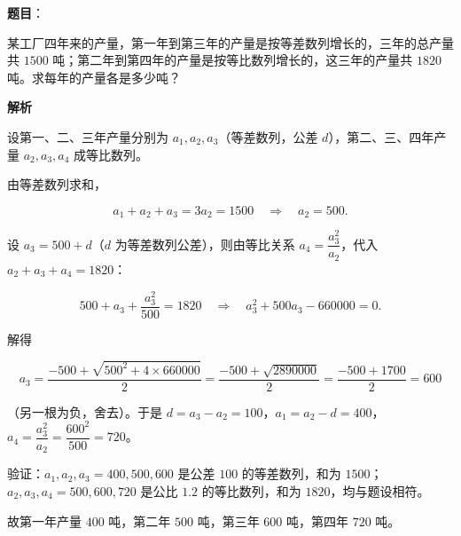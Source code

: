 \begin{answer}

\textbf{题目}：

某工厂四年来的产量，第一年到第三年的产量是按等差数列增长的，三年的总产量共 $1500$ 吨；第二年到第四年的产量是按等比数列增长的，这三年的产量共 $1820$ 吨。求每年的产量各是多少吨？

\textbf{解析}

设第一、二、三年产量分别为 $a_1,a_2,a_3$（等差数列，公差 $d$），第二、三、四年产量 $a_2,a_3,a_4$ 成等比数列。

由等差数列求和，

\nopagebreak[4]
\[
a_1+a_2+a_3=3a_2=1500\quad\Longrightarrow\quad a_2=500.
\]

设 $a_3=500+d$（$d$ 为等差数列公差），则由等比关系 $a_4=\dfrac{a_3^2}{a_2}$，代入 $a_2+a_3+a_4=1820$：

\nopagebreak[4]
\[
500+a_3+\frac{a_3^2}{500}=1820
\quad\Longrightarrow\quad
a_3^2+500a_3-660000=0.
\]

解得

\nopagebreak[4]
\[
a_3=\frac{-500+\sqrt{500^2+4\times660000}}{2}
=\frac{-500+\sqrt{2890000}}{2}
=\frac{-500+1700}{2}=600
\]

（另一根为负，舍去）。于是 $d=a_3-a_2=100$，$a_1=a_2-d=400$，$a_4=\dfrac{a_3^2}{a_2}=\dfrac{600^2}{500}=720$。

验证：$a_1,a_2,a_3=400,500,600$ 是公差 $100$ 的等差数列，和为 $1500$；$a_2,a_3,a_4=500,600,720$ 是公比 $1.2$ 的等比数列，和为 $1820$，均与题设相符。

故第一年产量 $400$ 吨，第二年 $500$ 吨，第三年 $600$ 吨，第四年 $720$ 吨。


\end{answer}
